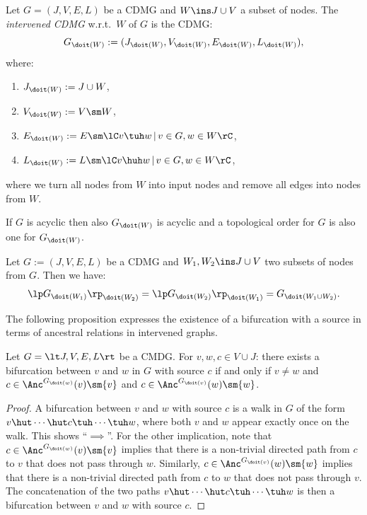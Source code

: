 \begin{Def}\label{def:G_hard_intervention}
    Let $G=(J,V,E,L)$ be a CDMG and $W \ins J \cup V$ a subset of nodes.
  The \emph{intervened CDMG} w.r.t.\ $W$ of $G$ is the CDMG: 
  \[ G_{\doit(W)}:=(J_{\doit(W)},V_{\doit(W)},E_{\doit(W)},L_{\doit(W)}),\] 
  where:
  \begin{enumerate}[label=\roman*.)]
      \item $J_{\doit(W)}:= J \cup W$,
      \item $V_{\doit(W)}:= V \sm W$,
      \item $E_{\doit(W)}:= E \sm \lC v \tuh w \,|\, v \in G, w  \in W  \rC$,
      \item $L_{\doit(W)}:= L \sm \lC v \huh w\,|\, v \in G, w \in W \rC$,
  \end{enumerate}
  where we turn all nodes from $W$ into input nodes and remove all edges into nodes from $W$.
\end{Def}

\begin{Rem}
    If $G$ is acyclic then also $G_{\doit(W)}$ is acyclic and a topological order for $G$ is also one for $G_{\doit(W)}$.
\end{Rem}

\begin{Lem}\label{hard-interventions-commute}
    Let $G:=(J,V,E,L)$ be a CDMG and $W_1, W_2 \ins J \cup V$ two  subsets of nodes from $G$. 
      Then we have:
      \[ \lp G_{\doit(W_1)} \rp_{\doit(W_2)} = \lp G_{\doit(W_2)} \rp_{\doit(W_1)} =  G_{\doit(W_1 \cup W_2)}. \]
\end{Lem}

The following proposition expresses the existence of a bifurcation with a source in terms of ancestral relations in intervened graphs.
\begin{Prp}\label{prp:bifurcations_alternative}
  Let $G = \lt J, V, E, L \rt$ be a CMDG. For $v, w, c \in V \cup J$:
  there exists a bifurcation between $v$ and $w$ in $G$ with source $c$ if and only if $v \ne w$ and $c \in \Anc^{G_{\doit(w)}}(v) \sm \{v\}$ and $c \in \Anc^{G_{\doit(v)}}(w) \sm \{w\}$.
\end{Prp}
\begin{proof}
  A bifurcation between $v$ and $w$ with source $c$ is a walk in $G$ of the form $v \hut \cdots \hut c \tuh \cdots \tuh w$, where both $v$ and $w$ appear exactly once on the walk.
  This shows ``$\implies$''. For the other implication, note that $c \in \Anc^{G_{\doit(w)}}(v) \sm \{v\}$ implies that there is a non-trivial directed path from $c$ to $v$ that does not pass through $w$. 
  Similarly, $c \in \Anc^{G_{\doit(v)}}(w) \sm \{w\}$ implies that there is a non-trivial directed path from $c$ to $w$ that does not pass through $v$. 
  The concatenation of the two paths $v \hut \cdots \hut c \tuh \cdots \tuh w$ is then a bifurcation between $v$ and $w$ with source $c$.
\end{proof}

